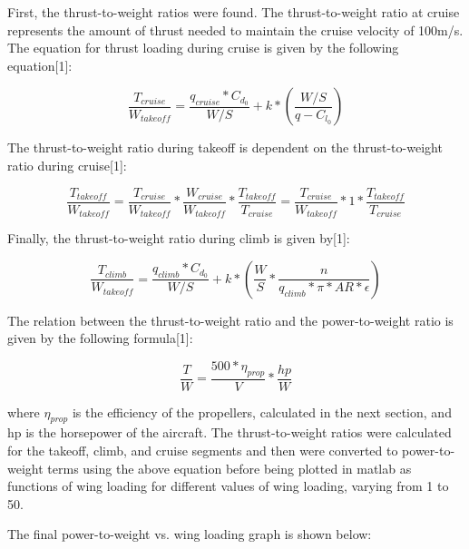 \documentclass{article}
\begin{document}
 First, the thrust-to-weight ratios were found. The thrust-to-weight ratio at cruise represents the amount of thrust needed to maintain the cruise velocity of 100m/s. The equation for thrust loading during cruise is given by the following equation[1]: 
 
 \begin {equation} 
 \frac{T_{cruise}}{W_{takeoff}} = \frac{q_{cruise}*C_{d_{0}}}{W/S} + k*(\frac{W/S}{q-C_{l_{0}}})
 \end {equation} 
 
 The thrust-to-weight ratio during takeoff is dependent on the thrust-to-weight ratio during cruise[1]: 
 
 \begin{equation}
      \frac{T_{takeoff}}{W_{takeoff}} =  \frac{T_{cruise}}{W_{takeoff}} * \frac{W_{cruise}}{W_{takeoff}}*\frac{T_{takeoff}}{T_{cruise}} =  \frac{T_{cruise}}{W_{takeoff}} * 1 * \frac{T_{takeoff}}{T_{cruise}}
 \end{equation}
 
 Finally, the thrust-to-weight ratio during climb is given by[1]: 
 
 \begin{equation} 
\frac{T_{climb}}{W_{takeoff}} = \frac{q_{climb}*C_{d_{0}}}{W/S} + k*(\frac{W}{S}*\frac{n}{q_{climb}*\pi*AR*\epsilon})
 \end{equation}
 
 The relation between the thrust-to-weight ratio and the power-to-weight ratio is given by the following formula[1]: 
 
 \begin{equation}
 \frac{T}{W} = \frac{500*\eta_{prop}}{V}*\frac{hp}{W}
 \end{equation}
 
 
 where $\eta_{prop}$ is the efficiency of the propellers, calculated in the next section, and hp is the horsepower of the aircraft. The thrust-to-weight ratios were calculated for the takeoff, climb, and cruise segments and then were converted to power-to-weight terms using the above equation before being plotted in matlab as functions of wing loading for different values of wing loading, varying from 1 to 50.
 

 
 
 The final power-to-weight vs. wing loading graph is shown below: 
 
\end{document}
